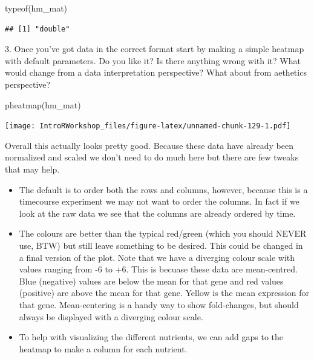 \documentclass[
]{book}
\newenvironment{Shaded}{\begin{snugshade}}{\end{snugshade}}
\newcommand{\FunctionTok}[1]{\textcolor[rgb]{0.00,0.00,0.00}{#1}}
\newcommand{\NormalTok}[1]{#1}
\providecommand{\tightlist}{%
  \setlength{\itemsep}{0pt}\setlength{\parskip}{0pt}}
\begin{document}
\begin{Shaded}
\begin{Highlighting}[]
\FunctionTok{typeof}\NormalTok{(hm\_mat)}
\end{Highlighting}
\end{Shaded}

\begin{verbatim}
## [1] "double"
\end{verbatim}

3. Once you've got data in the correct format start by making a simple heatmap with default parameters. Do you like it? Is there anything wrong with it? What would change from a data interpretation perspective? What about from aethetics perspective?

\begin{Shaded}
\begin{Highlighting}[]
\FunctionTok{pheatmap}\NormalTok{(hm\_mat)}
\end{Highlighting}
\end{Shaded}

\texttt{[image: IntroRWorkshop\_files/figure-latex/unnamed-chunk-129-1.pdf]}

Overall this actually looks pretty good. Because these data have already been normalized and scaled we don't need to do much here but there are few tweaks that may help.

\begin{itemize}
\tightlist
\item
  The default is to order both the rows and columns, however, because this is a timecourse experiment we may not want to order the columns. In fact if we look at the raw data we see that the columns are already ordered by time.
\item
  The colours are better than the typical red/green (which you should NEVER use, BTW) but still leave something to be desired. This could be changed in a final version of the plot. Note that we have a diverging colour scale with values ranging from -6 to +6. This is becuase these data are mean-centred. Blue (negative) values are below the mean for that gene and red values (positive) are above the mean for that gene. Yellow is the mean expression for that gene. Mean-centering is a handy way to show fold-changes, but should always be displayed with a diverging colour scale.
\item
  To help with visualizing the different nutrients, we can add gaps to the heatmap to make a column for each nutrient.
\end{itemize}
\end{document}
